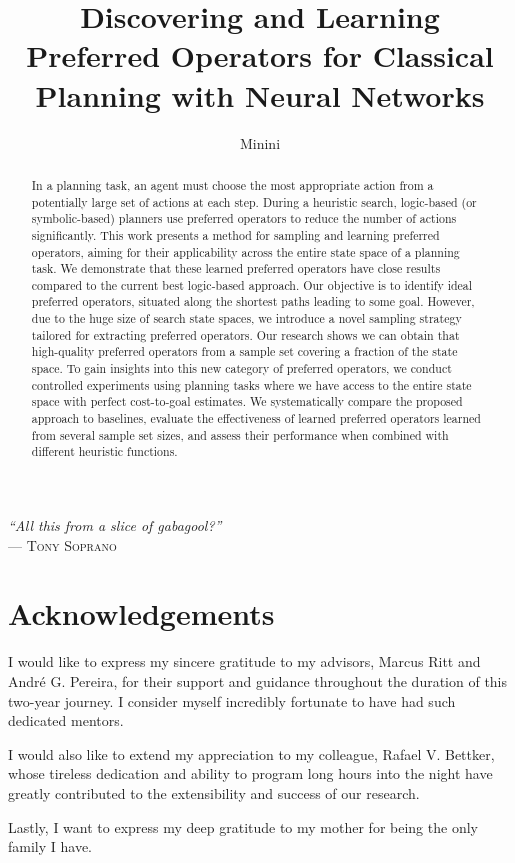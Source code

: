 \documentclass[ppgc,diss,english]{iiufrgs}
\title{Discovering and Learning Preferred Operators for Classical Planning with Neural Networks}
\author{Minini}{Pedro Probst}
\begin{document}
\maketitle

\clearpage
\begin{flushright}
\mbox{}\vfill
{\sffamily\itshape
    ``All this from a slice of gabagool?''\\}
--- \textsc{Tony Soprano}
\end{flushright}

\chapter*{Acknowledgements}

I would like to express my sincere gratitude to my advisors, Marcus Ritt and André G. Pereira, for their support and guidance throughout the duration of this two-year journey. I consider myself incredibly fortunate to have had such dedicated mentors.

I would also like to extend my appreciation to my colleague, Rafael V. Bettker, whose tireless dedication and ability to program long hours into the night have greatly contributed to the extensibility and success of our research.

Lastly, I want to express my deep gratitude to my mother for being the only family I have.

\begin{abstract}
In a planning task, an agent must choose the most appropriate action from a potentially large set of actions at each step. During a heuristic search, logic-based (or symbolic-based) planners use preferred operators to reduce the number of actions significantly. This work presents a method for sampling and learning preferred operators, aiming for their applicability across the entire state space of a planning task. We demonstrate that these learned preferred operators have close results compared to the current best logic-based approach.
Our objective is to identify ideal preferred operators, situated along the shortest paths leading to some goal. However, due to the huge size of search state spaces, we introduce a novel sampling strategy tailored for extracting preferred operators. Our research shows we can obtain that high-quality preferred operators from a sample set covering a fraction of the state space.
To gain insights into this new category of preferred operators, we conduct controlled experiments using planning tasks where we have access to the entire state space with perfect cost-to-goal estimates. We systematically compare the proposed approach to baselines, evaluate the effectiveness of learned preferred operators learned from several sample set sizes, and assess their performance when combined with different heuristic functions.
\end{abstract}
\end{document}
